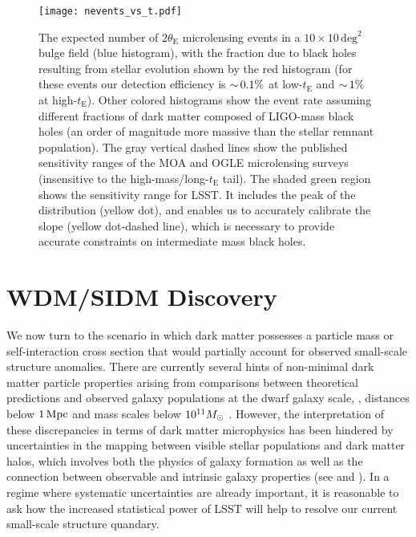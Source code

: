 \begin{figure}[t]
\centering
\texttt{[image: nevents\_vs\_t.pdf]}
\caption{\label{fig:macho_discovery}
  The expected number of $2\theta_\mathrm{E}$ microlensing events in a $10\times10\,\mathrm{deg}^2$ bulge field (blue histogram), with the fraction due to black holes resulting from stellar evolution shown by the red histogram (for these events our detection efficiency is $ {\sim}\, 0.1\%$ at low-$t_\mathrm{E}$ and $ {\sim}\, 1\%$ at high-$t_\mathrm{E}$).
  Other colored histograms show the event rate assuming different fractions of dark matter composed of LIGO-mass black holes (an order of magnitude more massive than the stellar remnant population).
  The gray vertical dashed lines show the published sensitivity ranges of the MOA and OGLE microlensing surveys (insensitive to the high-mass/long-$t_\mathrm{E}$ tail).
  The shaded green region shows the sensitivity range for LSST.
  It includes the peak of the distribution (yellow dot), and enables us to accurately calibrate the slope (yellow dot-dashed line), which is necessary to provide accurate constraints on intermediate mass black holes.  
}
\end{figure}

\section{WDM/SIDM Discovery}
\label{sec:wdm_sidm_discovery}

We now turn to the scenario in which dark matter possesses a particle mass or self-interaction cross section that would partially account for observed small-scale structure anomalies.
There are currently several hints of non-minimal dark matter particle properties arising from comparisons between theoretical predictions and observed galaxy populations at the dwarf galaxy scale, \ie, distances below $1 \mathrm{\,Mpc}$ and mass scales below $10^{11} M_\odot$ \citep[reviewed by][]{BuckleyPeter:2017,Bullock:2017}.
However, the interpretation of these discrepancies in terms of dark matter microphysics has been hindered by uncertainties in the mapping between visible stellar populations and dark matter halos, which involves both the physics of galaxy formation as well as the connection between observable and intrinsic galaxy properties (see  and ).
In a regime where systematic uncertainties are already important, it is reasonable to ask how the increased statistical power of LSST will help to resolve our current small-scale structure quandary.

